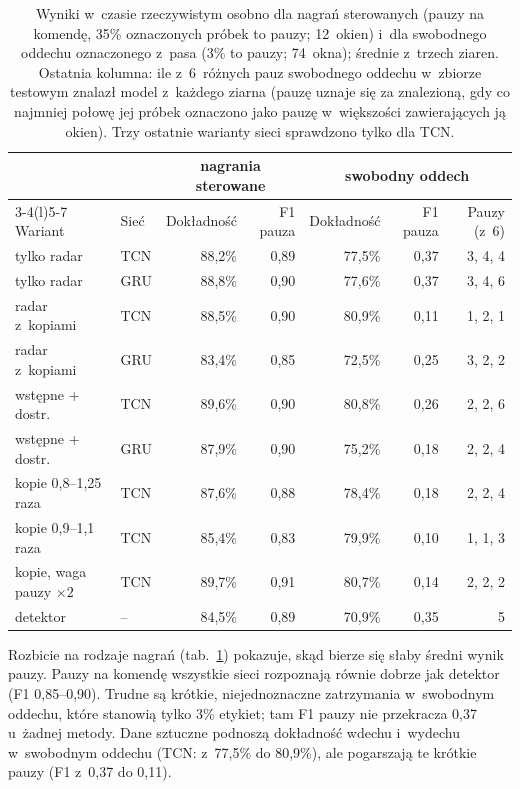 \documentclass[12pt,a4paper,oneside]{report}
\begin{document}
\begin{table}[H]
\centering
\small
\caption{Wyniki w~czasie rzeczywistym osobno dla nagrań sterowanych (pauzy na komendę,
35\% oznaczonych próbek to pauzy; 12~okien) i~dla swobodnego oddechu oznaczonego z~pasa
(3\% to pauzy; 74~okna); średnie z~trzech ziaren. Ostatnia kolumna: ile z~6~różnych pauz
swobodnego oddechu w~zbiorze testowym znalazł model z~każdego ziarna (pauzę uznaje się za
znalezioną, gdy co najmniej połowę jej próbek oznaczono jako pauzę w~większości zawierających
ją okien). Trzy ostatnie warianty sieci sprawdzono tylko dla TCN.}
\label{tab:sieci-wyniki-rodzaje}
\setlength{\tabcolsep}{4pt}
\begin{tabular}{@{}llrrrrr@{}}
\toprule
& & \multicolumn{2}{c}{nagrania sterowane} & \multicolumn{3}{c}{swobodny oddech} \\
\cmidrule(lr){3-4}\cmidrule(l){5-7}
Wariant & Sieć & Dokładność & F1 pauza & Dokładność & F1 pauza & Pauzy (z~6) \\
\midrule
tylko radar & TCN & 88,2\% & 0,89 & 77,5\% & 0,37 & 3, 4, 4 \\
tylko radar & GRU & 88,8\% & 0,90 & 77,6\% & 0,37 & 3, 4, 6 \\
radar z~kopiami & TCN & 88,5\% & 0,90 & 80,9\% & 0,11 & 1, 2, 1 \\
radar z~kopiami & GRU & 83,4\% & 0,85 & 72,5\% & 0,25 & 3, 2, 2 \\
wstępne + dostr. & TCN & 89,6\% & 0,90 & 80,8\% & 0,26 & 2, 2, 6 \\
wstępne + dostr. & GRU & 87,9\% & 0,90 & 75,2\% & 0,18 & 2, 2, 4 \\
\midrule
kopie 0,8--1,25 raza & TCN & 87,6\% & 0,88 & 78,4\% & 0,18 & 2, 2, 4 \\
kopie 0,9--1,1 raza & TCN & 85,4\% & 0,83 & 79,9\% & 0,10 & 1, 1, 3 \\
kopie, waga pauzy $\times 2$ & TCN & 89,7\% & 0,91 & 80,7\% & 0,14 & 2, 2, 2 \\
\midrule
detektor & -- & 84,5\% & 0,89 & 70,9\% & 0,35 & 5 \\
\bottomrule
\end{tabular}
\end{table}

Rozbicie na rodzaje nagrań (tab.~\ref{tab:sieci-wyniki-rodzaje}) pokazuje, skąd bierze
się słaby średni wynik pauzy. Pauzy na komendę wszystkie sieci rozpoznają równie dobrze
jak detektor (F1 0,85--0,90). Trudne są krótkie, niejednoznaczne zatrzymania
w~swobodnym oddechu, które stanowią tylko 3\% etykiet; tam F1 pauzy nie przekracza 0,37
u~żadnej metody. Dane sztuczne podnoszą dokładność wdechu i~wydechu w~swobodnym oddechu
(TCN: z~77,5\% do 80,9\%), ale pogarszają te krótkie pauzy (F1 z~0,37 do 0,11).
\end{document}
